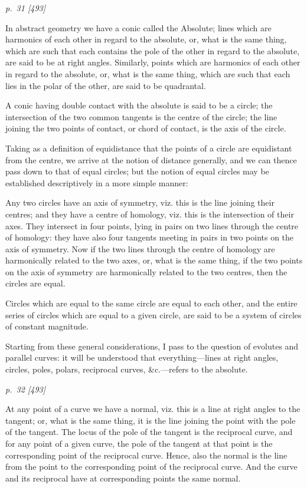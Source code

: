 ﻿\documentclass[11pt,a4paper]{article}
\theoremstyle{plain}
\theoremstyle{definition}
\begin{document}
\textit{p.~31 [493]}

In abstract geometry we have a conic called the Absolute; lines which are
harmonics of each other in regard to the absolute, or, what is the same
thing, which are such that each contains the pole of the other in regard to
the absolute, are said to be at right angles. Similarly, points which are
harmonics of each other in regard to the absolute, or, what is the same thing,
which are such that each lies in the polar of the other, are said to be
quadrantal.

A conic having double contact with the absolute is said to be a circle; the
intersection of the two common tangents is the centre of the circle; the line
joining the two points of contact, or chord of contact, is the axis of the
circle.

Taking as a definition of equidistance that the points of a circle are
equidistant from the centre, we arrive at the notion of distance generally,
and we can thence pass down to that of equal circles; but the notion of equal
circles may be established descriptively in a more simple manner:

Any two circles have an axis of symmetry, viz. this is the line joining their
centres; and they have a centre of homology, viz. this is the intersection of
their axes. They intersect in four points, lying in pairs on two lines through
the centre of homology: they have also four tangents meeting in pairs in two
points on the axis of symmetry. Now if the two lines through the centre of
homology are harmonically related to the two axes, or, what is the same thing,
if the two points on the axis of symmetry are harmonically related to the two
centres, then the circles are equal.

Circles which are equal to the same circle are equal to each other, and the
entire series of circles which are equal to a given circle, are said to be a
system of circles of constant magnitude.

Starting from these general considerations, I pass to the question of evolutes
and parallel curves: it will be understood that everything---lines at right
angles, circles, poles, polars, reciprocal curves, \&c.---refers to the
absolute.

\textit{p.~32 [493]}

At any point of a curve we have a normal, viz. this is a line at right
angles to the tangent; or, what is the same thing, it is the line joining
the point with the pole of the tangent. The locus of the pole of the
tangent is the reciprocal curve, and for any point of a given curve, the
pole of the tangent at that point is the corresponding point of the
reciprocal curve. Hence, also the normal is the line from the point to the
corresponding point of the reciprocal curve. And the curve and its
reciprocal have at corresponding points the same normal.
\end{document}
